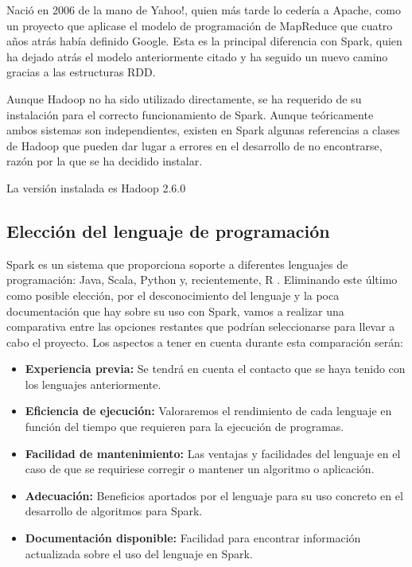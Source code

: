 Nació en 2006 de la mano de Yahoo!, quien más tarde lo cedería a Apache, como un proyecto que aplicase el modelo de programación de MapReduce que cuatro años atrás había definido Google. \cite{DatabricksSlides} Esta es la principal diferencia con Spark, quien ha dejado atrás el modelo anteriormente citado y ha seguido un nuevo camino gracias a las estructuras RDD.

Aunque Hadoop no ha sido utilizado directamente, se ha requerido de su instalación para el correcto funcionamiento de Spark. Aunque teóricamente ambos sistemas son independientes, existen en Spark algunas referencias a clases de Hadoop que pueden dar lugar a errores en el desarrollo de no encontrarse, razón por la que se ha decidido instalar.

La versión instalada es Hadoop 2.6.0

\subsection{Elección del lenguaje de programación} \label{EleccionLenguaje}

Spark es un sistema que proporciona soporte a diferentes lenguajes de programación: Java, Scala, Python y, recientemente, R \cite{SparkDoc}. Eliminando este último como posible elección, por el desconocimiento del lenguaje y la poca documentación que hay sobre su uso con Spark, vamos a realizar una comparativa entre las opciones restantes que podrían seleccionarse para llevar a cabo el proyecto. Los aspectos a tener en cuenta durante esta comparación serán: \\

\begin{itemize}
	\item \textbf{Experiencia previa:} Se tendrá en cuenta el contacto que se haya tenido con los lenguajes anteriormente.
	\item \textbf{Eficiencia de ejecución:} Valoraremos el rendimiento de cada lenguaje en función del tiempo que requieren para la ejecución de programas. 
	\item \textbf{Facilidad de mantenimiento:}  Las ventajas y facilidades del lenguaje en el caso de que se requiriese corregir o mantener un algoritmo o aplicación. 
	\item \textbf{Adecuación:} Beneficios aportados por el lenguaje para su uso concreto en el desarrollo de algoritmos para Spark.


	\item \textbf{Documentación disponible:} Facilidad para encontrar información actualizada sobre el uso del lenguaje en Spark.
	
\end{itemize}

